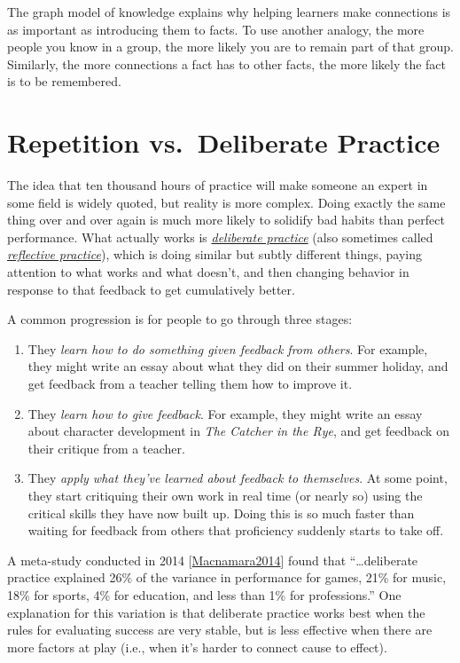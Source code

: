\documentclass[10pt,statementpaper]{memoir}
\begin{document}
The graph model of knowledge explains why helping learners make
connections is as important as introducing them to facts. To use another
analogy, the more people you know in a group, the more likely you are to
remain part of that group. Similarly, the more connections a fact has to
other facts, the more likely the fact is to be remembered.

\section{Repetition vs.~Deliberate
Practice}\label{repetition-vs.deliberate-practice}

The idea that ten thousand hours of practice will make someone an expert
in some field is widely quoted, but reality is more complex. Doing
exactly the same thing over and over again is much more likely to
solidify bad habits than perfect performance. What actually works is
\emph{\href{gloss.html\#deliberate-practice}{deliberate practice}} (also
sometimes called \emph{\href{gloss.html\#reflective-practice}{reflective
practice}}), which is doing similar but subtly different things, paying
attention to what works and what doesn't, and then changing behavior in
response to that feedback to get cumulatively better.

A common progression is for people to go through three stages:

\begin{enumerate}
\def\labelenumi{\arabic{enumi}.}
\item
  They \emph{learn how to do something given feedback from others}. For
  example, they might write an essay about what they did on their summer
  holiday, and get feedback from a teacher telling them how to improve
  it.
\item
  They \emph{learn how to give feedback}. For example, they might write
  an essay about character development in \emph{The Catcher in the Rye},
  and get feedback on their critique from a teacher.
\item
  They \emph{apply what they've learned about feedback to themselves}.
  At some point, they start critiquing their own work in real time (or
  nearly so) using the critical skills they have now built up. Doing
  this is so much faster than waiting for feedback from others that
  proficiency suddenly starts to take off.
\end{enumerate}

A meta-study conducted in 2014
{[}\href{biblio.html\#macnamara-deliberate}{Macnamara2014}{]} found that
``\ldots{}deliberate practice explained 26\% of the variance in
performance for games, 21\% for music, 18\% for sports, 4\% for
education, and less than 1\% for professions.'' One explanation for this
variation is that deliberate practice works best when the rules for
evaluating success are very stable, but is less effective when there are
more factors at play (i.e., when it's harder to connect cause to
effect).
\end{document}
